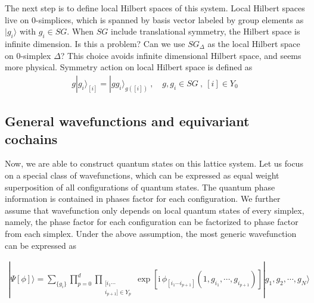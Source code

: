 \documentclass[%
 reprint,
 amsmath,amssymb,
 aps,pra,
]{revtex4-1}
\newcommand{\ii}{\mathrm{i}\,} %
\begin{document}
The next step is to define local Hilbert spaces of this system.
Local Hilbert spaces live on 0-simplices, which is spanned by basis vector labeled by group elements as $|g_i\rangle$ with $g_i\in SG$.
{\color{red} When $SG$ include translational symmetry, the Hilbert space is infinite dimension. Is this a problem?
Can we use $SG_\Delta$ as the local Hilbert space on 0-simplex $\Delta$? This choice avoids infinite dimensional Hilbert space, and seems more physical.}
Symmetry action on local Hilbert space is defined as
\begin{align}
  g|g_i\rangle_[i]=|g g_i\rangle_{g([i])}~,\quad g,g_i\in SG~,\ [i]\in Y_0
  \label{}
\end{align}


\subsection{General wavefunctions and equivariant cochains}
Now, we are able to construct quantum states on this lattice system.
Let us focus on a special class of wavefunctions, which can be expressed as equal weight superposition of all configurations of quantum states.
The quantum phase information is contained in phases factor for each configuration.
We further assume that wavefunction only depends on local quantum states of every simplex, namely, the phase factor for each configuration can be factorized to phase factor from each simplex.
Under the above assumption, the most generic wavefunction can be expressed as
\begin{widetext}
\begin{align}
  |\Psi[\phi]\rangle=\sum_{\{g_i\}}\prod_{p=0}^d \prod_{\substack{[i_1 \cdots\\ i_{p+1}]\in Y_p}} \exp\left[ \ii \phi_{[i_1\cdots i_{p+1}]}(1,g_{i_1},\cdots,g_{i_{p+1}}) \right] |g_1,g_2,\cdots,g_N\rangle
  \label{eq:equivariant_cochain_wf}
\end{align}
\end{widetext}
\end{document}
